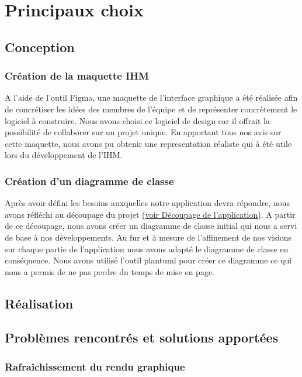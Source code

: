 \documentclass[11pt]{report}
\begin{document}
\chapter{Principaux choix}

\section{Conception}

\subsection{Création de la maquette IHM}

A l'aide de l'outil Figma, une maquette de l'interface graphique a été réalisée afin de concrétiser les idées des membres de l'équipe
et de représenter concrètement le logiciel à construire. Nous avons choisi ce logiciel de design car il offrait la possibilité de
collaborer sur un projet unique. En apportant tous nos avis sur cette maquette, nous avons pu obtenir une representation réaliste qui à
été utile lors du développement de l'IHM.

\subsection{Création d'un diagramme de classe}

Après avoir défini les besoins auxquelles notre application devra répondre, nous avons réfléchi au découpage du projet \hyperlink{découpage}{(voir Découpage de l'application)}.
A partir de ce découpage, nous avons créer un diagramme de classe initial qui nous a servi de base à nos développements. 
Au fur et à mesure de l'affinement de nos visions sur chaque partie de l'application nous avons adapté le diagramme de classe en conséquence.
Nous avons utilisé l'outil plantuml pour créer ce diagramme ce qui nous a permis de ne pas perdre du temps de mise en page. 

\section{Réalisation}

\section{Problèmes rencontrés et solutions apportées}

\subsection{Rafraîchissement du rendu graphique}
\end{document}
